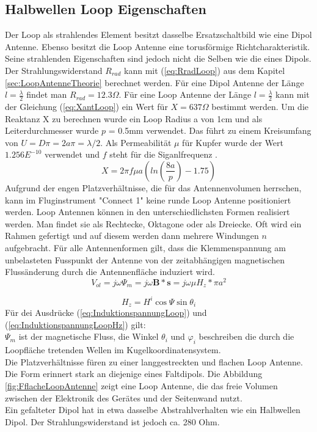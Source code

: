 \subsection{Halbwellen Loop Eigenschaften}
Der Loop als strahlendes Element besitzt dasselbe Ersatzschaltbild wie eine Dipol Antenne. Ebenso besitzt die Loop Antenne eine torusförmige Richtcharakteristik. Seine strahlenden Eigenschaften sind jedoch nicht die Selben wie die eines Dipols. Der Strahlungswiderstand $R_{rad}$ kann mit (\ref{eq:RradLoop}) aus dem Kapitel \ref{sec:LoopAntenneTheorie} berechnet werden. Für eine Dipol Antenne der Länge $l=\frac{\lambda}{2}$ findet man $R_{rad} = 12.3\Omega$. Für eine Loop Antenne der Länge $l=\frac{\lambda}{2}$ kann mit der Gleichung (\ref{eq:XantLoop}) ein Wert für $X = 637 \Omega$ bestimmt werden. Um die Reaktanz X zu berechnen wurde ein Loop Radius a von 1cm und als Leiterdurchmesser wurde $p$ = 0.5mm verwendet. Das führt zu einem Kreisumfang von $U=D\pi=2a\pi=\lambda /2$. Als Permeabilität $\mu $ für Kupfer wurde der Wert $1.256E^{-10}$ verwendet und $f$ steht für die Siganlfrequenz \cite{Antenne_Theory_Xant_Loop}.
\begin{equation}\label{eq:XantLoop}
X= 2\pi f\mu a(ln \left( \frac{8a}{p} \right) - 1.75)
\end{equation}
Aufgrund der engen Platzverhältnisse, die für das Antennenvolumen herrschen, kann im Fluginstrument "Connect 1" keine runde Loop Antenne positioniert werden. Loop Antennen können in den unterschiedlichsten Formen realisiert werden. Man findet sie als Rechtecke, Oktagone oder als Dreiecke. Oft wird ein Rahmen gefertigt und auf diesem werden dann mehrere Windungen $n$ aufgebracht. Für alle Antennenformen gilt, dass die Klemmenspannung am unbelasteten Fusspunkt der Antenne von der zeitabhängigen magnetischen Flussänderung durch die Antennenfläche induziert wird.
\begin{equation}\label{eq:InduktionspannungLoop}
V_{ol}= j\omega\Psi_{m}=j\omega\textbf{B}*\textbf{s}= j\omega\mu H_{z}*\pi a^{2}
\end{equation}

\begin{equation}\label{eq:InduktionspannungLoopHz}
H_{z}=H^{i}\cos\Psi\sin\theta_{i}
\end{equation}
Für dei Ausdrücke  (\ref{eq:InduktionspannungLoop}) und (\ref{eq:InduktionspannungLoopHz}) gilt: \\
$\Psi_{m}$ ist der magnetische Fluss, die Winkel $\theta_{i}$ und $\varphi_{i}$ beschreiben die durch die Loopfläche tretenden Wellen im  Kugelkoordinatensystem.\\ 
Die Platzverhältnisse füren zu einer langgestreckten und flachen Loop Antenne. Die Form erinnert stark an diejenige eines Faltdipols. Die Abbildung \ref{fig:FflacheLoopAntenne} zeigt eine Loop Antenne, die das freie Volumen zwischen der Elektronik des Gerätes und der Seitenwand nutzt.\\
Ein gefalteter Dipol hat in etwa dasselbe Abstrahlverhalten wie ein Halbwellen Dipol. Der Strahlungswiderstand ist jedoch ca. 280 Ohm. 

